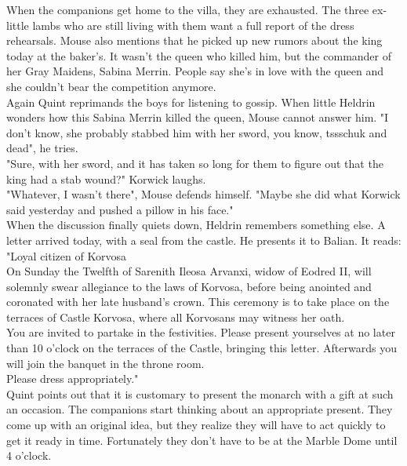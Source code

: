 When the companions get home to the villa, they are exhausted. The three ex-little lambs who are still living with them want a full report of the dress rehearsals. Mouse also mentions that he picked up new rumors about the king today at the baker's. It wasn't the queen who killed him, but the commander of her Gray Maidens, Sabina Merrin. People say she's in love with the queen and she couldn't bear the competition anymore.\\

Again Quint reprimands the boys for listening to gossip. When little Heldrin wonders how this Sabina Merrin killed the queen, Mouse cannot answer him. "I don't know, she probably stabbed him with her sword, you know, tssschuk and dead", he tries.\\

"Sure, with her sword, and it has taken so long for them to figure out that the king had a stab wound?" Korwick laughs.\\

"Whatever, I wasn't there", Mouse defends himself. "Maybe she did what Korwick said yesterday and pushed a pillow in his face."\\

When the discussion finally quiets down, Heldrin remembers something else. A letter arrived today, with a seal from the castle. He presents it to Balian. It reads:\\

"Loyal citizen of Korvosa\\

On Sunday the Twelfth of Sarenith Ileosa Arvanxi, widow of Eodred II, will solemnly swear allegiance to the laws of Korvosa, before being anointed and coronated with her late husband's crown. This ceremony is to take place on the terraces of Castle Korvosa, where all Korvosans may witness her oath.\\

You are invited to partake in the festivities. Please present yourselves at no later than 10 o'clock on the terraces of the Castle, bringing this letter. Afterwards you will join the banquet in the throne room.\\

Please dress appropriately."\\

Quint points out that it is customary to present the monarch with a gift at such an occasion. The companions start thinking about an appropriate present. They come up with an original idea, but they realize they will have to act quickly to get it ready in time. Fortunately they don't have to be at the Marble Dome until 4 o'clock.\\

